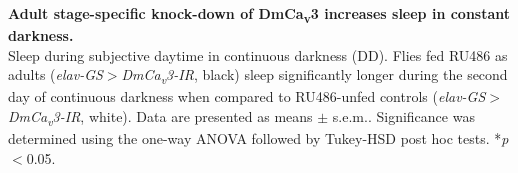 \label{fig:S4}
\textbf{Adult stage-specific knock-down of DmCa\textsubscript{v}3 increases sleep in constant darkness.}
\\
Sleep during subjective daytime in continuous darkness (DD). 
Flies fed RU486 as adults (\emph{elav-GS$>$DmCa\textsubscript{v}3-IR}, black) sleep significantly longer during the second day of continuous darkness when compared to RU486-unfed controls (\emph{elav-GS$>$DmCa\textsubscript{v}3-IR}, white).
Data are presented as means $\pm$ s.e.m..
Significance was determined using the one-way ANOVA followed by Tukey-HSD post hoc tests.
*\emph{p}$<$0.05.
